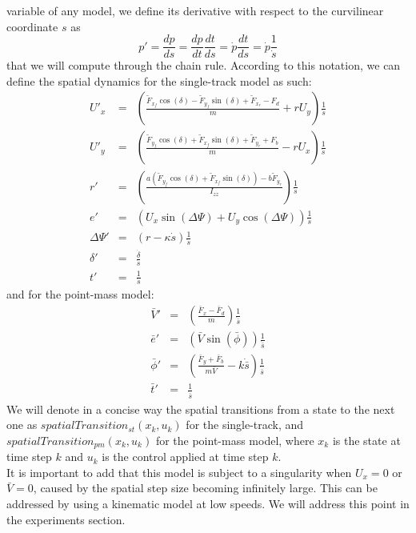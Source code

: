 \documentclass[a4paper, onecolumn, 12pt]{article}
\begin{document}
variable of any model, we define its derivative with respect to the curvilinear
coordinate $s$ as
\begin{equation}
    p' = \frac{d p}{d s} = \frac{dp}{dt} \frac{dt}{ds} = \dot{p} \frac{dt}{ds} = \dot{p} \frac{1}{\dot{s}}
\end{equation}  
that we will compute through the chain rule.
According to this notation, we can define the spatial dynamics for the single-track model as such:
\begin{subequations}
    \begin{eqnarray}
        U'_x &=& \left(\frac{\tilde{F}_{x_f}\cos(\delta)-\tilde{F}_{y_f}\sin(\delta)+\tilde{F}_{x_r}-F_d}{m}+rU_y\right) \frac{1}{\dot{s}}\\
        U'_y &=& \left(\frac{\tilde{F}_{y_f}\cos(\delta)+\tilde{F}_{x_f}\sin(\delta)+\tilde{F}_{y_r}+F_b}{m}-rU_x\right) \frac{1}{\dot{s}}\\
        r' &=& \left(\frac{a(\tilde{F}_{y_f}\cos(\delta)+\tilde{F}_{x_f}\sin(\delta))-b\tilde{F}_{y_r}}{I_{zz}}\right) \frac{1}{\dot{s}}\\
        e' &=& \left(U_x\sin(\Delta \varPsi)+U_y \cos(\Delta \varPsi)\right) \frac{1}{\dot{s}}\\
        \Delta \varPsi' &=& \left(r-\kappa \dot{s}\right) \frac{1}{\dot{s}}\\
        \delta ' &=& \frac{\dot{\delta}}{\dot{s}}\\
        t' &=& \frac{1}{\dot{s}}
    \end{eqnarray}
\end{subequations}
and for the point-mass model:
\begin{subequations}
    \begin{eqnarray}
        {\bar{V}}' &=& \left(\frac{\bar{F}_{x}-\bar{F}_{d}}{m}\right) \frac{1}{\dot{\bar{s}}}\\
        {\bar{e}}' &=& \left(\bar{V}\sin(\bar{\phi})\right)\frac{1}{\dot{\bar{s}}}\\
        {\bar{\phi}}' &=& \left(\frac{{\bar{F}}_y + {\bar{F}}_b}{m\bar{V}} - k\dot{\bar{s}}\right)\frac{1}{\dot{\bar{s}}}\\
        \bar{t}' &=& \frac{1}{\dot{\bar{s}}}
    \end{eqnarray}
\end{subequations}
We will denote in a concise way the spatial transitions from a state to the next one as
$spatialTransition_{st}(x_k, u_k)$ for the single-track, and $spatialTransition_{pm}(x_k, u_k)$ 
for the point-mass model, where $x_k$ is the state at time step $k$ and $u_k$ is the control
applied at time step $k$. \\
It is important to add that this model is subject to a singularity when $U_x=0$
or $\bar V=0$, caused by the spatial step size becoming infinitely large. This
can be addressed by using a kinematic model at low speeds. We will address this
point in the experiments section. 
\end{document}
